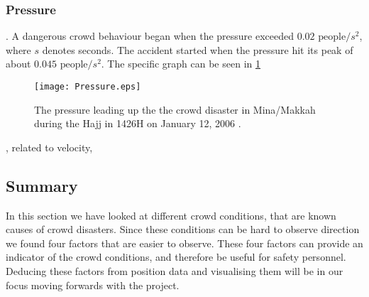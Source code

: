 
\subsubsection{Pressure}
. A dangerous crowd behaviour began when the pressure exceeded $0.02 \text{ people} / s^2$, where $s$ denotes seconds. The accident started when the pressure hit its peak of about $0.045 \text{ people} / s^2$. The specific graph can be seen in \cref{mekkahCrowdDistaster206}

\begin{figure}
    \centering
    \texttt{[image: Pressure.eps]}
    \caption{The pressure leading up the the crowd disaster in Mina/Makkah during the Hajj in 1426H on January 12, 2006 \cite{empircalstudy}.}
    \label{mekkahCrowdDistaster206}
\end{figure}


, related to velocity,



\subsection{Summary}\label{sec:crowd_conditions_summary}

In this section we have looked at different crowd conditions, that are known causes of crowd disasters. Since these conditions can be hard to observe direction we found four factors that are easier to observe. These four factors can provide an indicator of the crowd conditions, and therefore be useful for safety personnel. Deducing these factors from position data and visualising them will be in our focus moving forwards with the project.